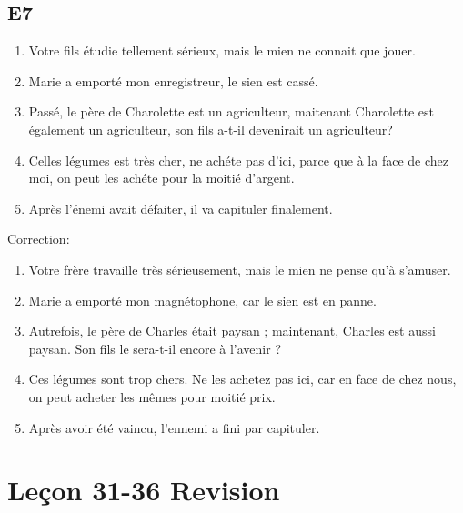 \documentclass{book}
\begin{document}
    \section{E7}
        \begin{enumerate}
            \item Votre fils étudie tellement sérieux, mais le mien ne connait que jouer.
            \item Marie a emporté mon enregistreur, le sien est cassé.
            \item Passé, le père de Charolette est un agriculteur, maitenant Charolette est également un agriculteur,
                    son fils a-t-il devenirait un agriculteur?
            \item Celles légumes est très cher, ne achéte pas d'ici, 
                    parce que à la face de chez moi, on peut les achéte pour la moitié d'argent.
            \item Après l'énemi avait défaiter, il va capituler finalement.
        \end{enumerate}
        Correction:
        \begin{enumerate}
            \item Votre frère travaille très sérieusement, mais le mien ne pense qu'à s'amuser.
            \item Marie a emporté mon magnétophone, car le sien est en panne.
            \item Autrefois, le père de Charles était paysan ; maintenant, Charles est aussi paysan. Son fils le sera-t-il encore à l'avenir ?
            \item Ces légumes sont trop chers. Ne les achetez pas ici, car en face de chez nous, on peut acheter les mêmes pour moitié prix.
            \item Après avoir été vaincu, l'ennemi a fini par capituler.
        \end{enumerate}
    
\chapter{Leçon 31-36 Revision}
\end{document}
